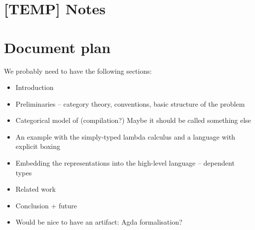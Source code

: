 \section{[TEMP] Notes}\label{sec:notes}

\section{Document plan}

We probably need to have the following sections:

\begin{itemize}
  \item Introduction
  \item Preliminaries -- category theory, conventions, basic structure of the problem
  \item Categorical model of (compilation?) Maybe it should be called something else
  \item An example with the simply-typed lambda calculus and a language with explicit
        boxing
  \item Embedding the representations into the high-level language -- dependent types
  \item Related work
  \item Conclusion + future
  \item Would be nice to have an artifact: Agda formalisation?
\end{itemize}



